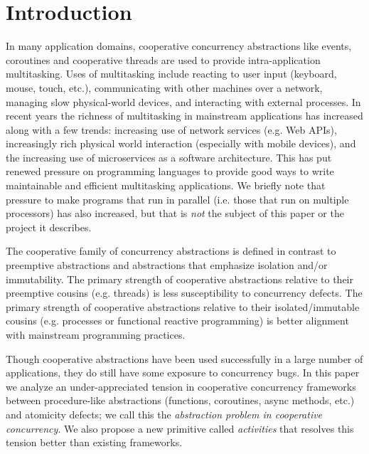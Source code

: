 \documentclass[9pt,preprint]{sigplanconf}
\begin{document}




\section{Introduction}

In many application domains, cooperative concurrency abstractions like events, coroutines and cooperative threads are used to provide intra-application multitasking.
Uses of multitasking include reacting to user input (keyboard, mouse, touch, etc.), communicating with other machines over a network, managing slow physical-world devices, and interacting with external processes.
In recent years the richness of multitasking in mainstream applications has increased along with a few trends: increasing use of network services (e.g. Web APIs), increasingly rich physical world interaction (especially with mobile devices), and the increasing use of microservices as a software architecture.
This has put renewed pressure on programming languages to provide good ways to write maintainable and efficient multitasking applications.
We briefly note that pressure to make programs that run in parallel (i.e. those that run on multiple processors) has also increased, but that is \emph{not} the subject of this paper or the project it describes.

The cooperative family of concurrency abstractions is defined in contrast to preemptive abstractions and abstractions that emphasize isolation and/or immutability.
The primary strength of cooperative abstractions relative to their preemptive cousins (e.g. threads) is less susceptibility to concurrency defects.
The primary strength of cooperative abstractions relative to their isolated/immutable cousins (e.g. processes or functional reactive programming) is better alignment with mainstream programming practices.

Though cooperative abstractions have been used successfully in a large number of applications, they do still have some exposure to concurrency bugs.
In this paper we analyze an under-appreciated tension in cooperative concurrency frameworks between procedure-like abstractions (functions, coroutines, async methods, etc.) and atomicity defects; we call this the \emph{abstraction problem in cooperative concurrency}.
We also propose a new primitive called \emph{activities} that resolves this tension better than existing frameworks.
\end{document}
